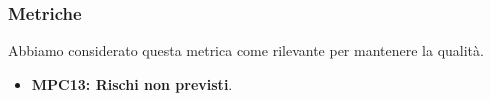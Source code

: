\subsubsection{Metriche}
Abbiamo considerato questa metrica come rilevante per mantenere la qualità.
\begin{itemize}
    \item \textbf{MPC13: Rischi non previsti}.
\end{itemize}
